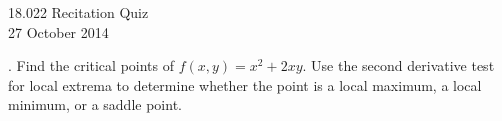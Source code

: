 \documentclass[11pt]{article}
\theoremstyle{definition}
\newcounter{prob}
\newcounter{subprob}
\newcommand\itm{\theprob.  \stepcounter{prob}\setcounter{subprob}{1}}
\newcommand\sol[2]{\iftoggle{solutions}{\textit{Solution}. #1}{#2}}
\renewcommand\vec[1]{\mathbf{#1}}
\begin{document}
\thispagestyle{empty}

\begin{center}
  18.022 Recitation Quiz \iftoggle{solutions}{(with solutions)}{} \\
  27 October 2014 
\end{center}

\itm Find the critical points of $f(x,y) = x^2 + 2xy$. Use the second derivative test for local extrema to determine whether the point is a local maximum, a local minimum, or a saddle point. 

\sol{The gradient of $f$ is $(2x+2y,2x)$, which equals $\vec{0}$ if and only if $(x,y) = (0,0)$. Therefore, the origin is the only critical point of $f$. The Hessian evaluated at $(0,0)$ is 
\[
\left|
\begin{array}{{cc}}
  f_{xx} & f_{xy} \\
  f_{xy} & f_{yy}
\end{array}
\right| = 
\left|
\begin{array}{{cc}}
  2 & 2 \\
  2 & 0
\end{array}
\right| = 2\cdot 0 - 2 \cdot 2 < 0,
\]
so the origin is a saddle point. 

}{\vfill} 
\end{document}
